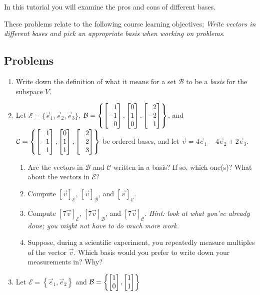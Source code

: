		\begin{objectives}
	In this tutorial you will examine the pros and cons of different bases.

	These problems relate to the following course learning objectives:
	\textit{Write vectors in
different bases and pick an appropriate basis when working on problems}.
		\end{objectives}


\subsection*{Problems}

\begin{enumerate}
	\item Write down the definition of what it means for a set $\mathcal B$ to be a \emph{basis}
		for the subspace $V$.
	\item Let $\mathcal E=\{\vec e_1,\vec e_2,\vec e_3\}$, $\mathcal B=\left\{\mat{1\\-1\\0},\mat{0\\1\\0},\mat{2\\-2\\1}\right\}$,
		and $\mathcal C=\left\{\mat{1\\-1\\1},\mat{0\\1\\1},\mat{2\\-2\\3}\right\}$
		be ordered bases, and let $\vec v=4\vec e_1-4\vec e_2+2\vec e_3$.
	\begin{enumerate}
		\item Are the vectors in $\mathcal B$ and $\mathcal C$ written in a basis? If so, which one(s)?
			What about the vectors in $\mathcal E$?\
		\item Compute $[\vec v]_{\mathcal E}$, $[\vec v]_{\mathcal B}$, and $[\vec v]_{\mathcal C}$.
		\item Compute $[7\vec v]_{\mathcal E}$, $[7\vec v]_{\mathcal B}$, and $[7\vec v]_{\mathcal C}$. \emph{Hint: look
			at what you've already done; you might not have to do much more work.}
		\item Suppose, during a scientific experiment, you repeatedly measure multiples of the vector $\vec v$. Which
			basis would you prefer to write down your measurements in? Why?
	\end{enumerate}
\item Let $\mathcal E=\left\{\vec e_1, \vec e_2\right\}$ and $\mathcal B=\left\{\mat{1\\0},\mat{1\\1}\right\}$

\end{enumerate}
